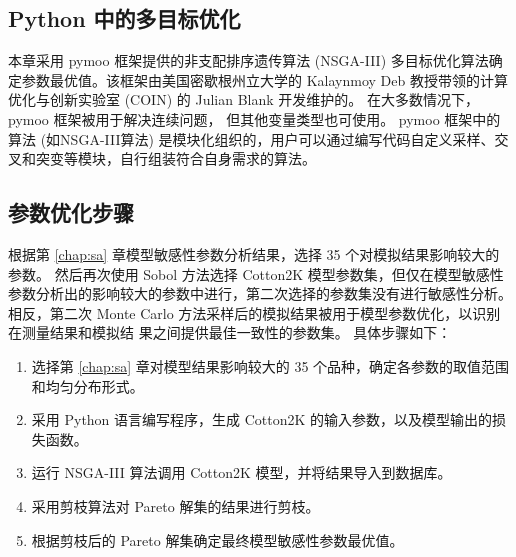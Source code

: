 \subsection{Python 中的多目标优化}
本章采用 pymoo 框架提供的非支配排序遗传算法 (NSGA-III) 多目标优化算法确定参数最优值。该框架由美国密歇根州立大学的 Kalaynmoy Deb 教授带领的计算优化与创新实验室 (COIN) 的 Julian Blank 开发维护的。%
在大多数情况下，pymoo 框架被用于解决连续问题， 但其他变量类型也可使用。%
pymoo 框架中的算法 (如NSGA-III算法) 是模块化组织的，用户可以通过编写代码自定义采样、交叉和突变等模块，自行组装符合自身需求的算法。%

\subsection{参数优化步骤}
根据第 \ref{chap:sa} 章模型敏感性参数分析结果，选择 35 个对模拟结果影响较大的参数。
然后再次使用 Sobol 方法选择 Cotton2K 模型参数集，但仅在模型敏感性参数分析出的影响较大的参数中进行，第二次选择的参数集没有进行敏感性分析。%
相反，第二次 Monte Carlo 方法采样后的模拟结果被用于模型参数优化，以识别在测量结果和模拟结 果之间提供最佳一致性的参数集。%
具体步骤如下：
\begin{enumerate}
    \item 选择第 \ref{chap:sa} 章对模型结果影响较大的 35 个品种，确定各参数的取值范围和均匀分布形式。
    \item 采用 Python 语言编写程序，生成 Cotton2K 的输入参数，以及模型输出的损失函数。
    \item 运行 NSGA-III 算法调用 Cotton2K 模型，并将结果导入到数据库。
    \item 采用剪枝算法对 Pareto 解集的结果进行剪枝。
    \item 根据剪枝后的 Pareto 解集确定最终模型敏感性参数最优值。
\end{enumerate}

